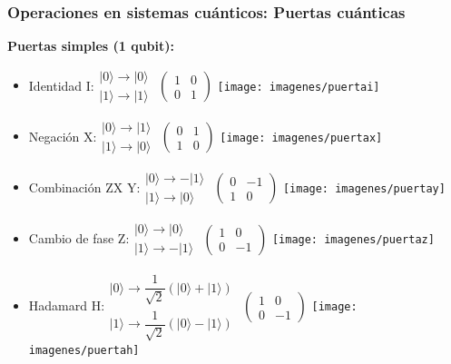 \documentclass{beamer}
\newcommand{\filados}[2]{ \left. \begin{array}{c}	#1 \\	#2	 \end{array} \right. }
\newcommand{\base}[1]{|#1\rangle}
\newcommand{\puertai}{\texttt{[image: imagenes/puertai]}}
\newcommand{\puertax}{\texttt{[image: imagenes/puertax]}}
\newcommand{\puertay}{\texttt{[image: imagenes/puertay]}}
\newcommand{\puertaz}{\texttt{[image: imagenes/puertaz]}}
\newcommand{\puertah}{\texttt{[image: imagenes/puertah]}}
\begin{document}
\begin{frame}
	\frametitle{Operaciones en sistemas cuánticos: Puertas cuánticas}
	\textbf{Puertas simples (1 qubit):}
	\begin{itemize}
	\item Identidad I:$\filados{\base0\to\base0}{\base1\to\base1}$
	$\left({\begin{array}{cc}1&0\\0&1\end{array} } \right)$ \puertai
	
	\item Negación X:$\filados{\base0\to\base1}{\base1\to\base0}$
	$\left({\begin{array}{cc}0&1\\1&0\end{array} } \right)$ \puertax
	
	\item Combinación ZX Y:$\filados{\base0\to-\base{1}}{\base1\to\base0}$
	$\left({\begin{array}{cc}0&-1\\1&0\end{array} } \right)$ \puertay
	
	\item Cambio de fase Z:$\filados{\base0\to\base0}{\base1\to-\base1}$ 
	$\left({\begin{array}{cc}1&0\\0&-1\end{array} } \right)$ \puertaz
	
	\item Hadamard H:$\filados{\base0\to\dfrac{1}{\sqrt{2}}(\base0 + \base1)}{\base1\to\dfrac{1}{\sqrt{2}}(\base0 - \base1)}$ 
	$\left({\begin{array}{cc}1&0\\0&-1\end{array} } \right)$ \puertah
	\end{itemize}
\end{frame}
\end{document}
